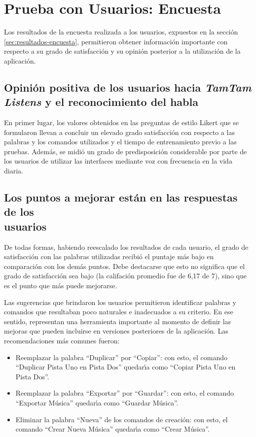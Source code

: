 \section{Prueba con Usuarios: Encuesta}
Los resultados de la encuesta realizada a los usuarios, expuestos en la secci\'on \ref{sec:resultados-encuesta},
permitieron obtener informaci\'on importante con respecto a su grado de satisfacci\'on y su opini\'on 
posterior a la utilizaci\'on de la aplicaci\'on.

\subsection[Opini\'on positiva de los usuarios hacia \emph{TamTam Listens} y el \\ reconocimiento del habla]
{Opini\'on positiva de los usuarios hacia \emph{TamTam Listens} y el reconocimiento del habla}
En primer lugar, los valores obtenidos en las preguntas de estilo Likert que se formularon
llevan a concluir un elevado grado satisfacci\'on con respecto a las palabras y los comandos
utilizados y el tiempo de entrenamiento previo a las pruebas.
Adem\'as, se midi\'o un grado de predisposici\'on considerable por parte de los usuarios de utilizar
las interfaces mediante voz con frecuencia en la vida diaria.

\subsection[Los puntos a mejorar est\'an en las respuestas de los usuarios]
{Los puntos a mejorar est\'an en las respuestas de los \\ usuarios}
De todas formas, habiendo reescalado los resultados de cada usuario, el grado de satisfacci\'on
con las palabras utilizadas recibi\'o el puntaje m\'as bajo en comparaci\'on con los dem\'as puntos.
Debe destacarse que esto no significa que el grado de satisfacci\'on sea bajo (la califaci\'on promedio
fue de 6,17 de 7), sino que es el punto que m\'as puede mejorarse.

Las sugerencias que brindaron los usuarios permitieron identificar palabras y comandos que 
resultaban poco naturales e inadecuados a su criterio. En ese sentido, representan una herramienta
importante al momento de definir las mejoras que pueden incluirse en versiones posteriores de la
aplicaci\'on. Las recomendaciones m\'as comunes fueron:

\begin{itemize}
	\item Reemplazar la palabra ``Duplicar'' por ``Copiar'': con esto, el comando 
	``Duplicar Pista Uno en Pista Dos'' quedar{{\'\i}}a como ``Copiar Pista Uno en Pista Dos''. 
	\item Reemplazar la palabra ``Exportar'' por ``Guardar'': con esto, el comando 
	``Exportar M\'usica'' quedar{{\'\i}}a como ``Guardar M\'usica''.
	\item Eliminar la palabra ``Nueva'' de los comandos de creaci\'on: con esto, el comando 
	``Crear Nueva M\'usica'' quedar{{\'\i}}a como ``Crear M\'usica''.
\end{itemize}

